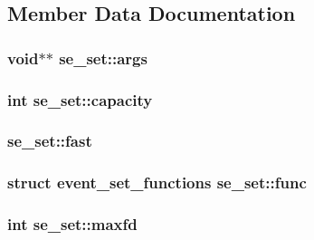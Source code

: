 \subsection{Member Data Documentation}
\hypertarget{structse__set_ab9ecd80c456aecaa6cb0067cc16e503e}{}
\subsubsection[{args}]{\setlength{\rightskip}{0pt plus 5cm}void$\ast$$\ast$ se\+\_\+set\+::args}\label{structse__set_ab9ecd80c456aecaa6cb0067cc16e503e}
\hypertarget{structse__set_a8ca7f4830c70077cd476d2a552e88861}{}
\subsubsection[{capacity}]{\setlength{\rightskip}{0pt plus 5cm}int se\+\_\+set\+::capacity}\label{structse__set_a8ca7f4830c70077cd476d2a552e88861}
\hypertarget{structse__set_a455761d7a57f96c362b21662020c4bec}{}
\subsubsection[{fast}]{ se\+\_\+set\+::fast}\label{structse__set_a455761d7a57f96c362b21662020c4bec}
\hypertarget{structse__set_a8544306ac8186a9a95e8354cb3694bf4}{}
\subsubsection[{func}]{\setlength{\rightskip}{0pt plus 5cm}struct {\bf event\+\_\+set\+\_\+functions} se\+\_\+set\+::func}\label{structse__set_a8544306ac8186a9a95e8354cb3694bf4}
\hypertarget{structse__set_ab00550b034fbc8a2b8ff54294b5ddcf5}{}
\subsubsection[{maxfd}]{\setlength{\rightskip}{0pt plus 5cm}int se\+\_\+set\+::maxfd}\label{structse__set_ab00550b034fbc8a2b8ff54294b5ddcf5}
\hypertarget{structse__set_ad1cb2f201590bb23bb61881fbe4ddf61}{}
